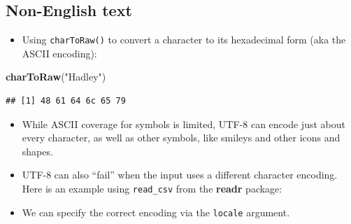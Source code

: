 \documentclass[
]{article}
\newenvironment{Shaded}{\begin{snugshade}}{\end{snugshade}}
\newcommand{\FunctionTok}[1]{\textcolor[rgb]{0.13,0.29,0.53}{\textbf{#1}}}
\newcommand{\NormalTok}[1]{#1}
\newcommand{\OtherTok}[1]{\textcolor[rgb]{0.56,0.35,0.01}{#1}}
\newcommand{\SpecialCharTok}[1]{\textcolor[rgb]{0.81,0.36,0.00}{\textbf{#1}}}
\newcommand{\StringTok}[1]{\textcolor[rgb]{0.31,0.60,0.02}{#1}}
\providecommand{\tightlist}{%
  \setlength{\itemsep}{0pt}\setlength{\parskip}{0pt}}
\begin{document}
\subsection{Non-English text}\label{non-english-text}

\begin{itemize}
\tightlist
\item
  Using \texttt{charToRaw()} to convert a character to its hexadecimal
  form (aka the ASCII encoding):
\end{itemize}

\begin{Shaded}
\begin{Highlighting}[]
\FunctionTok{charToRaw}\NormalTok{(}\StringTok{"Hadley"}\NormalTok{)}
\end{Highlighting}
\end{Shaded}

\begin{verbatim}
## [1] 48 61 64 6c 65 79
\end{verbatim}

\begin{itemize}
\item
  While ASCII coverage for symbols is limited, UTF-8 can encode just
  about every character, as well as other symbols, like smileys and
  other icons and shapes.
\item
  UTF-8 can also ``fail'' when the input uses a different character
  encoding. Here is an example using \texttt{read\_csv} from the
  \textbf{readr} package:
\end{itemize}

\begin{Shaded}
\end{Shaded}

\begin{itemize}
\tightlist
\item
  We can specify the correct encoding via the \texttt{locale} argument.
\end{itemize}
\end{document}
